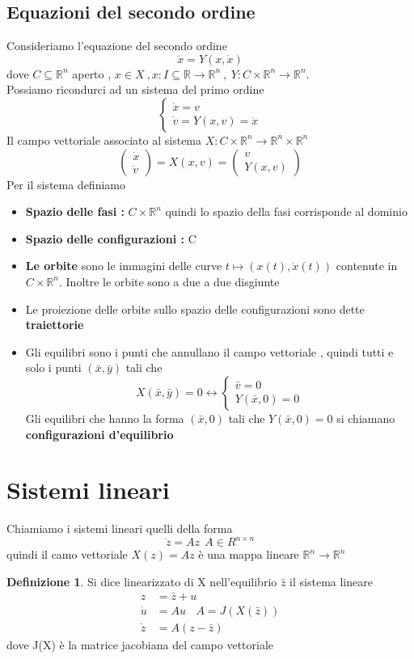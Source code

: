 \documentclass{article}
\theoremstyle{definition}
\newtheorem{definizione}{Definizione}[section]
\newcommand{\R}{\mathbb{R}}
\newcommand{\Rn}{\R^n}
\begin{document}
	\subsection{Equazioni del secondo ordine}
	Consideriamo l'equazione del secondo ordine 
	$$\ddot{x}=Y(x,\dot{x})$$
	dove $C \subseteq \Rn$ aperto , $x \in X  \ , x: I \subseteq \R \rightarrow \Rn \ ,  \ Y: C \times \Rn \rightarrow \Rn $.\\ Possiamo ricondurci ad un sistema del primo ordine 
	$$\begin{cases}
		\dot{x}=v \\
		\dot{v}=Y(x,v)=\ddot{x}
	\end{cases}$$
	Il campo vettoriale associato al sistema $X: C \times \Rn \rightarrow \Rn \times \Rn$
	$$\begin{pmatrix}
		\dot{x}\\
		\dot{v}
	\end{pmatrix}=X(x,v)=\begin{pmatrix}
		v \\
		Y(x,v)
	\end{pmatrix}$$
	Per il sistema definiamo 
	\begin{itemize}
		\item \textbf{Spazio delle fasi :} $C \times \Rn$ quindi lo spazio della fasi corrisponde al dominio
		\item \textbf{Spazio delle configurazioni :} C 
		\item \textbf{Le orbite} sono le immagini delle curve $t \mapsto (x(t),\dot{x}(t))$ contenute in $C \times \Rn$. Inoltre le orbite sono a due a due disgiunte 
		\item Le proiezione delle orbite sullo spazio delle configurazioni sono dette \textbf{traiettorie} 
		\item Gli equilibri sono i punti che annullano il  campo vettoriale , quindi tutti e solo i punti $(\bar{x},\bar{y})$ tali che 
		$$X(\bar{x},\bar{y})=0 \leftrightarrow \begin{cases}
			\bar{v}=0 \\
			Y(\bar{x},0)=0
		\end{cases}$$
		Gli equilibri che hanno la forma $(\bar{x},0)$ tali che $Y(\bar{x},0)=0$ si chiamano \textbf{configurazioni d'equilibrio}
	\end{itemize}
	\section{Sistemi lineari}
	Chiamiamo i sistemi lineari quelli della forma 
	$$\dot{z}=Az \ \ A \in R^{n\times n}$$ quindi il camo vettoriale $X(z)=Az$ è una mappa lineare $\Rn \rightarrow \Rn$
\begin{definizione}
	Si dice linearizzato di X nell'equilibrio $\bar{z}$ il sistema lineare \begin{align*}
	z&=\bar{z}+u\\
\dot{u}&=Au \ \ \ \ A= J(X(\bar{z}))	\\
\dot{z}&=A(z - \bar{z})
\end{align*}dove J(X) è la matrice jacobiana del campo vettoriale 
\end{definizione}
\end{document}
